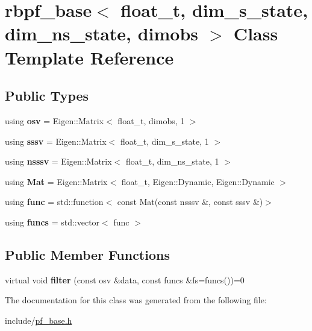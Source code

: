 \hypertarget{classrbpf__base}{}\section{rbpf\+\_\+base$<$ float\+\_\+t, dim\+\_\+s\+\_\+state, dim\+\_\+ns\+\_\+state, dimobs $>$ Class Template Reference}
\label{classrbpf__base}
\subsection*{Public Types}
\begin{DoxyCompactItemize}
\item 
\mbox{\label{classrbpf__base_a232936f9aba33d2cb3ec0a74d86ff673}} 
using {\bfseries osv} = Eigen\+::\+Matrix$<$ float\+\_\+t, dimobs, 1 $>$
\item 
\mbox{\label{classrbpf__base_ab2eccf330f9b74a01b4131ebf650fc45}} 
using {\bfseries sssv} = Eigen\+::\+Matrix$<$ float\+\_\+t, dim\+\_\+s\+\_\+state, 1 $>$
\item 
\mbox{\label{classrbpf__base_af80df010347845efac98659ecf7bb1f2}} 
using {\bfseries nsssv} = Eigen\+::\+Matrix$<$ float\+\_\+t, dim\+\_\+ns\+\_\+state, 1 $>$
\item 
\mbox{\label{classrbpf__base_a195c55dcd55fb4a1a5a08c44603bd683}} 
using {\bfseries Mat} = Eigen\+::\+Matrix$<$ float\+\_\+t, Eigen\+::\+Dynamic, Eigen\+::\+Dynamic $>$
\item 
\mbox{\label{classrbpf__base_ab97a27bf3704125176265f8cbb1ccb75}} 
using {\bfseries func} = std\+::function$<$ const Mat(const nsssv \&, const sssv \&)$>$
\item 
\mbox{\label{classrbpf__base_a5e2ffe0b6e10136fcac986314664f938}} 
using {\bfseries funcs} = std\+::vector$<$ func $>$
\end{DoxyCompactItemize}
\subsection*{Public Member Functions}
\begin{DoxyCompactItemize}
\item 
\mbox{\label{classrbpf__base_afe22a67962a28c83b8568b96f80e9c7b}} 
virtual void {\bfseries filter} (const osv \&data, const funcs \&fs=funcs())=0
\end{DoxyCompactItemize}


The documentation for this class was generated from the following file\+:\begin{DoxyCompactItemize}
\item 
include/\hyperlink{pf__base_8h}{pf\+\_\+base.\+h}\end{DoxyCompactItemize}
